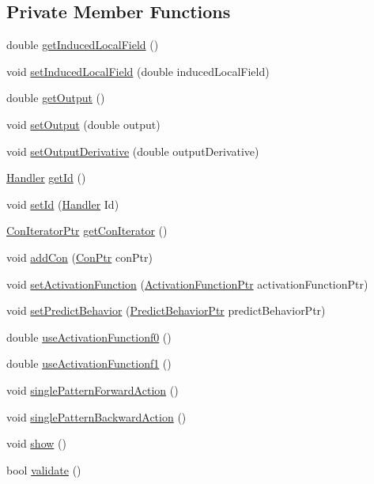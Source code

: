 \subsection*{Private Member Functions}
\begin{DoxyCompactItemize}
\item 
double \hyperlink{class_simple_neuron_ac7d28dffa06f0825c4b7d12e981ce9b1}{getInducedLocalField} ()
\item 
void \hyperlink{class_simple_neuron_a6f0a732980dc4860757b475539085324}{setInducedLocalField} (double inducedLocalField)
\item 
double \hyperlink{class_simple_neuron_ae5a325412827ad1f63e2a75f82023267}{getOutput} ()
\item 
void \hyperlink{class_simple_neuron_af59d76e80aea2bb224b817390f083bf9}{setOutput} (double output)
\item 
void \hyperlink{class_simple_neuron_a53a5a3754c38d4558d23d15152a2275a}{setOutputDerivative} (double outputDerivative)
\item 
\hyperlink{_a_m_o_r_e_8h_abc871abb71cff6655b8172ee7240b8ef}{Handler} \hyperlink{class_simple_neuron_a2ed8cdd977472afaecca2c6b27c6beef}{getId} ()
\item 
void \hyperlink{class_simple_neuron_a7330de5a6a79925b950f78a65c529297}{setId} (\hyperlink{_a_m_o_r_e_8h_abc871abb71cff6655b8172ee7240b8ef}{Handler} Id)
\item 
\hyperlink{_a_m_o_r_e_8h_a819efaf710ead601ac8241df5e235dd8}{ConIteratorPtr} \hyperlink{class_simple_neuron_a53a18c4b7ff06ae1a05eadc7222c7197}{getConIterator} ()
\item 
void \hyperlink{class_simple_neuron_a07d0ec8afcfde17098277e1ff2a5a61d}{addCon} (\hyperlink{_a_m_o_r_e_8h_a169bb8e5f26ce70bf2b10dec2fb5ee50}{ConPtr} conPtr)
\item 
void \hyperlink{class_simple_neuron_a3ccde895829b70bd0f6e42903d469b5f}{setActivationFunction} (\hyperlink{_a_m_o_r_e_8h_a77602a0277a02e5769c3df0adc669b17}{ActivationFunctionPtr} activationFunctionPtr)
\item 
void \hyperlink{class_simple_neuron_a8f230b4566e85adda71c7e0633d8a20d}{setPredictBehavior} (\hyperlink{_a_m_o_r_e_8h_a1fb2f1f8fdf1e08c42ef4bdce436af93}{PredictBehaviorPtr} predictBehaviorPtr)
\item 
double \hyperlink{class_simple_neuron_abf7f3ad2eac82aec49c1521d26521ff2}{useActivationFunctionf0} ()
\item 
double \hyperlink{class_simple_neuron_a48f96e836e8d34c213e6e6e2c056ba57}{useActivationFunctionf1} ()
\item 
void \hyperlink{class_simple_neuron_a8fdcbb3dad7d499a496feadc6a27bb9f}{singlePatternForwardAction} ()
\item 
void \hyperlink{class_simple_neuron_a7e63496ca2eb173688f85d510f5cbbfa}{singlePatternBackwardAction} ()
\item 
void \hyperlink{class_simple_neuron_afea22112336409283a5bb7d281f7f4bd}{show} ()
\item 
bool \hyperlink{class_simple_neuron_a9e7173abb892281d0b2ffb0efc82f0e5}{validate} ()
\end{DoxyCompactItemize}


